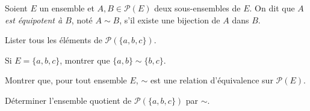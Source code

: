 
\begingroup

\begin{exercice}[Equipotence]\label{exo:introduction/maths/equipotence}

  Soient $E$ un ensemble et $A, B \in \mathscr{P}(E)$ deux sous-ensembles de $E$. On dit que \emph{$A$ est équipotent à $B$}, noté
  $A \sim B$, s'il existe une bijection de $A$ dans $B$.
  \begin{questions}
  \item Lister tous les éléments de $\mathscr{P}(\{a, b, c\})$.
  \item Si $E = \{a, b, c\}$, montrer que $\{a, b\} \sim \{b, c\}$. 
  \item Montrer que, pour tout ensemble $E$, $\sim$ est une relation d'équivalence sur  $\mathscr{P}(E)$. 
  \item Déterminer l'ensemble quotient de $\mathscr{P}(\{a, b, c\})$ par $\sim$. 
  \end{questions}

\end{exercice}

